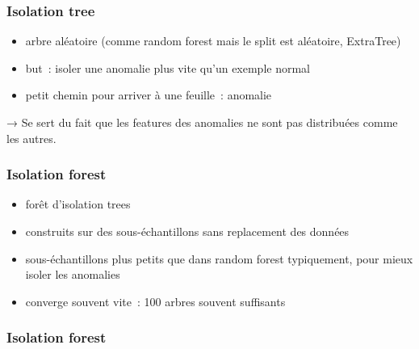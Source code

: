 \documentclass{formation}
\begin{document}
\begin{frame}
  \frametitle{Isolation tree}
  \begin{itemize}
  \item arbre aléatoire (comme random forest mais le split est
    aléatoire, ExtraTree)
  \item but : isoler une anomalie plus vite qu'un exemple normal
  \item petit chemin pour arriver à une feuille : anomalie
  \end{itemize}

  → Se sert du fait que les features des anomalies ne sont pas
  distribuées comme les autres.
\end{frame}

\begin{frame}
  \frametitle{Isolation forest}
  \begin{itemize}
  \item forêt d'isolation trees
  \item construits sur des sous-échantillons sans replacement des
    données
  \item sous-échantillons plus petits que dans random forest
    typiquement, pour mieux isoler les anomalies
  \item converge souvent vite : 100 arbres souvent suffisants
  \end{itemize}
\end{frame}

\begin{frame}
  \frametitle{Isolation forest}
\end{frame}
\end{document}
